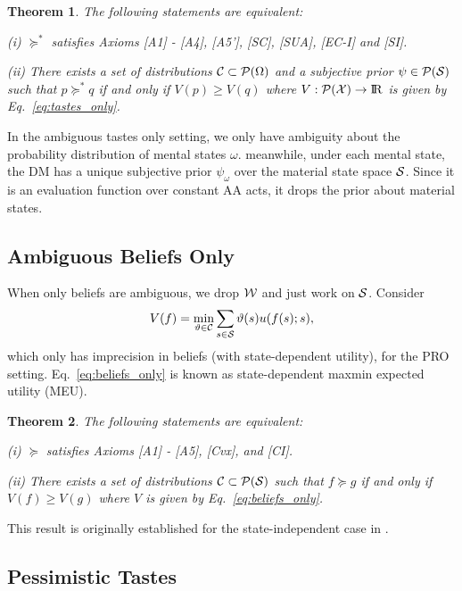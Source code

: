 \documentclass[11pt,oneside]{article}
\theoremstyle{plain}
\theoremstyle{plain}
\theoremstyle{plain}
\newtheorem{thm}{Theorem}[section]
\theoremstyle{plain}
\theoremstyle{plain}
\theoremstyle{definition}
\theoremstyle{definition}
\theoremstyle{remark}
\theoremstyle{plain}
\newcommand{\R}{{\rm I\!R}}
\newcommand{\calps}{{\cal P}({\cal S})}
\newcommand{\calpx}{{\cal P}({\cal X})}
\newcommand{\mcs}{{\cal S}}
\newcommand{\pfs}{\succeq^*}
\begin{document}
\begin{thm}
\label{thm:tastes_only}
The following statements are equivalent:

(i) $\pfs$ satisfies Axioms [A1] - [A4], [A5'], [SC], [SUA], [EC-I] and [SI].

(ii) There exists a set of distributions ${\cal C} \subset \mathcal{P}(\Omega)$ and a subjective prior $\psi \in \calps$ such that $p \pfs q$ if and only if $V(p) \geq V(q)$ where $V : \calpx \rightarrow \R$ is given by Eq.~\eqref{eq:tastes_only}.
\end{thm}

In the ambiguous tastes only setting, we only have ambiguity about the probability distribution of mental states $\omega$. meanwhile, under each mental state,
the DM has a unique subjective prior $\psi_\omega$ over the material state space $ \mcs$. Since it is an evaluation function over constant AA acts, it drops the prior
about material states.

\subsection{Ambiguous Beliefs Only}

When only beliefs are ambiguous, we drop ${\cal W}$ and just work on $\mcs$.
Consider
%
\begin{equation}
\label{eq:beliefs_only}
V(f) = \min_{\vartheta \in {\cal C}} \sum_{s \in \mcs} \vartheta(s) u(f(s); s),
\end{equation}
%
which only has imprecision in beliefs (with state-dependent utility), for the PRO setting.
Eq.~\eqref{eq:beliefs_only} is known as state-dependent maxmin expected utility (MEU).

\begin{thm}
\label{thm:beliefs_only}
The following statements are equivalent:
    
(i) $\succeq$ satisfies Axioms [A1] - [A5], [Cvx], and [CI]. 

(ii) There exists a set of distributions ${\cal C} \subset \calps$ such that $f \succeq g$ if and only if $V(f) \geq V(g)$ where $V$ is given by Eq.~\eqref{eq:beliefs_only}.
\end{thm}
\noindent
This result is originally established for the state-independent case in \cite{gilboa1989maxmin}.



\subsection{Pessimistic Tastes}
\end{document}
